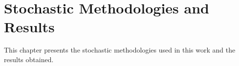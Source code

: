 \chapter{Stochastic Methodologies and Results}
\label{chp:stochastic-methodologies-and-results}

This chapter presents the stochastic methodologies used in this work and the results obtained.